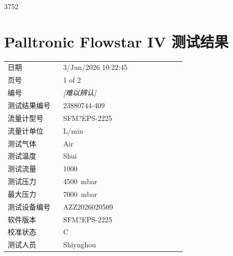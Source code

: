 \documentclass[UTF8,10pt,a4paper,fontset=fandol]{ctexart}
\newcommand{\fieldvalue}[1]{#1}
\newcommand{\handwritten}[1]{#1}
\begin{document}
\handwritten{3752}

\vspace{0.5em}


\newpage

\section*{Palltronic Flowstar IV 测试结果}

\begin{tabular}{@{}p{0.28\linewidth}p{0.62\linewidth}@{}}
日期 &
\fieldvalue{3/Jun/2026 10:22:45}
\\
页号 &
\fieldvalue{1 of 2}
\\
编号 &
\fieldvalue{\textit{[难以辨认]}}
\\
测试结果编号 &
\fieldvalue{23880744-409}
\\
流量计型号 &
\fieldvalue{SFM?EPS-2225}
\\
流量计单位 &
\fieldvalue{L/min}
\\
测试气体 &
\fieldvalue{Air}
\\
测试温度 &
\fieldvalue{Shui}
\\
测试流量 &
\fieldvalue{1000}
\\
测试压力 &
\fieldvalue{4500~mbar}
\\
最大压力 &
\fieldvalue{7000~mbar}
\\
测试设备编号 &
\fieldvalue{AZZ2026020509}
\\
软件版本 &
\fieldvalue{SFM?EPS-2225}
\\
校准状态 &
\fieldvalue{C}
\\
测试人员 &
\fieldvalue{Shiynghou}
\\
\end{tabular}
\end{document}

